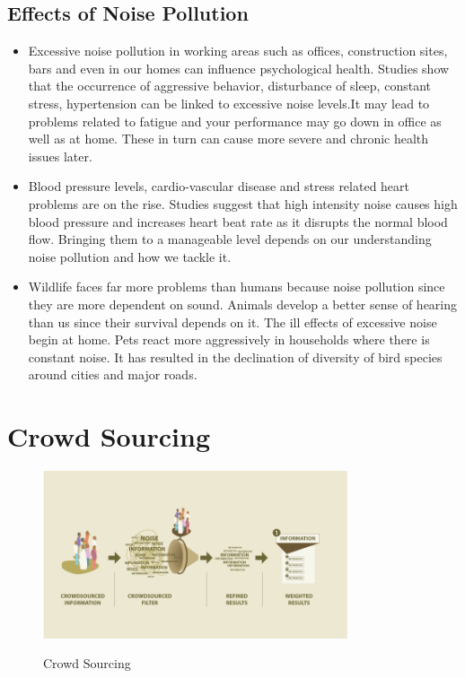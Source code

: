 \subsection{Effects of Noise Pollution}

\begin{itemize}
	\item Excessive noise pollution in working areas such as offices, construction sites, bars and even in our homes can influence psychological health. Studies show that the occurrence of aggressive behavior, disturbance of sleep, constant stress, hypertension can be linked to excessive noise levels.It may lead to problems related to fatigue and your performance may go down in office as well as at home. These in turn can cause more severe and chronic health issues later.
	
	\item Blood pressure levels, cardio-vascular disease and stress related heart problems are on the rise. Studies suggest that high intensity noise causes high blood pressure and increases heart beat rate as it disrupts the normal blood flow. Bringing them to a manageable level depends on our understanding noise pollution and how we tackle it.
	
	\item Wildlife faces far more problems than humans because noise pollution since they are more dependent on sound. Animals develop a better sense of hearing than us since their survival depends on it. The ill effects of excessive noise begin at home. Pets react more aggressively in households where there is constant noise. It has resulted in the declination of diversity of bird species around cities and major roads.
\end{itemize}

\section{Crowd Sourcing}

\begin{figure}[!htbp]
	\includegraphics[width=0.8\textwidth]{2.png}
	\centering
	\label{fig:Croud Sourcing}
	\caption{Crowd Sourcing}
\end{figure}

